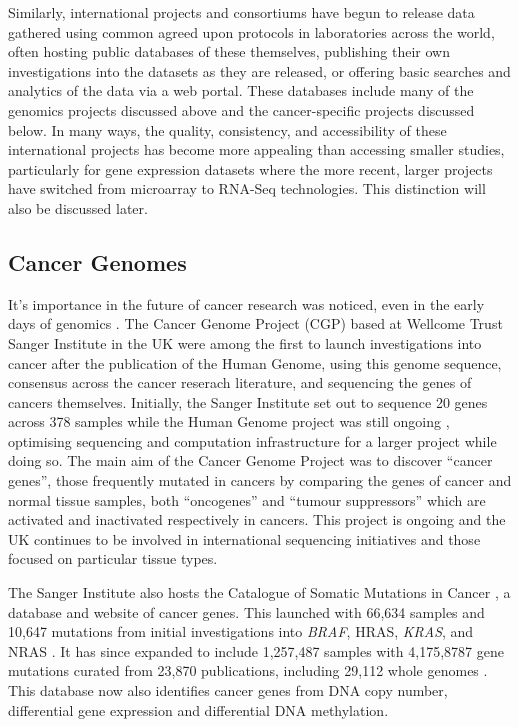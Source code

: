 Similarly, international projects and consortiums have begun to release data gathered using common agreed upon protocols in laboratories across the world, often hosting public databases of these themselves, publishing their own investigations into the datasets as they are released, or offering basic searches and analytics of the data via a web portal. These databases include many of the genomics projects discussed above and the cancer-specific projects discussed below. In many ways, the quality, consistency, and accessibility of these international projects has become more appealing than accessing smaller studies, particularly for gene expression datasets where the more recent, larger projects have switched from microarray to RNA-Seq technologies. This distinction will also be discussed later.

\subsection{Cancer Genomes}
It's importance in the future of cancer research was noticed, even in the early days of genomics \citep{Dickson1999}. The Cancer Genome Project (CGP) based at Wellcome Trust Sanger Institute in the UK were among the first to launch investigations into cancer after the publication of the Human Genome, using this genome sequence, consensus across the cancer reserach literature, and sequencing the genes of cancers themselves. Initially, the Sanger Institute set out to sequence 20 genes across 378 samples while the Human Genome project was still ongoing \citep{Collins2007}, optimising sequencing and computation infrastructure for a larger project while doing so. The main aim of the Cancer Genome Project was to discover ``cancer genes'', those frequently mutated in cancers by comparing the genes of cancer and normal tissue samples, both ``oncogenes'' and ``tumour suppressors'' which are activated and inactivated respectively in cancers. This project is ongoing and the UK continues to be involved in international sequencing initiatives and those focused on particular tissue types.

The Sanger Institute also hosts the Catalogue of Somatic Mutations in Cancer \citep{COSMICdb}, a database and website of cancer genes. This launched with 66,634 samples and 10,647 mutations from initial investigations into \textit{BRAF}, HRAS, \textit{KRAS}, and NRAS \citep{Bamford2004}. It has since expanded to include 1,257,487 samples with 4,175,8787 gene mutations curated from 23,870 publications, including 29,112 whole genomes \citep{COSMICdb}. This database now also identifies cancer genes from DNA copy number, differential gene expression and differential DNA methylation.

